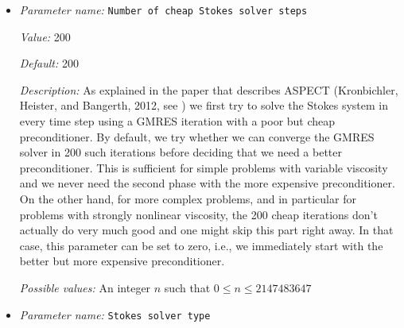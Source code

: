 \begin{itemize}
{\it Value:} 0


{\it Default:} 1000


{\it Description:} This sets the maximum number of iterations used in the expensive Stokes solver. If this value is set too low for the size of the problem, the Stokes solver will not converge and return an error message pointing out that the user didn't allow a sufficiently large number of iterations for the iterative solver to converge.


{\it Possible values:} An integer $n$ such that $0\leq n \leq 2147483647$
\item {\it Parameter name:} {\tt Number of cheap Stokes solver steps}
\label{parameters:Solver parameters/Stokes solver parameters/Number of cheap Stokes solver steps}
\label{parameters:Solver_20parameters/Stokes_20solver_20parameters/Number_20of_20cheap_20Stokes_20solver_20steps}


{\it Value:} 200


{\it Default:} 200


{\it Description:} As explained in the paper that describes ASPECT (Kronbichler, Heister, and Bangerth, 2012, see \cite{KHB12}) we first try to solve the Stokes system in every time step using a GMRES iteration with a poor but cheap preconditioner. By default, we try whether we can converge the GMRES solver in 200 such iterations before deciding that we need a better preconditioner. This is sufficient for simple problems with variable viscosity and we never need the second phase with the more expensive preconditioner. On the other hand, for more complex problems, and in particular for problems with strongly nonlinear viscosity, the 200 cheap iterations don't actually do very much good and one might skip this part right away. In that case, this parameter can be set to zero, i.e., we immediately start with the better but more expensive preconditioner.


{\it Possible values:} An integer $n$ such that $0\leq n \leq 2147483647$
\item {\it Parameter name:} {\tt Stokes solver type}
\label{parameters:Solver parameters/Stokes solver parameters/Stokes solver type}
\label{parameters:Solver_20parameters/Stokes_20solver_20parameters/Stokes_20solver_20type}



\end{itemize}
